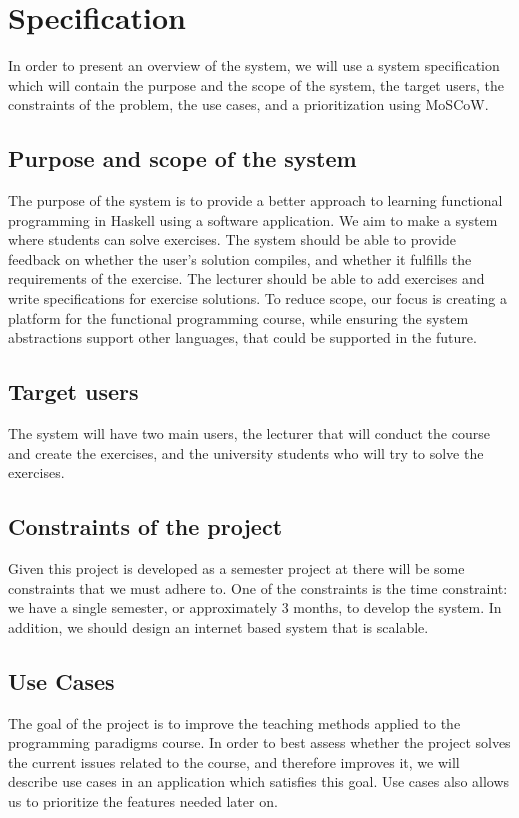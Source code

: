 \chapter{Specification}
In order to present an overview of the system, we will use a system specification which will contain the purpose and the scope of the system, the target users, the constraints of the problem, the use cases, and a prioritization using MoSCoW.

\section*{Purpose and scope of the system }
The purpose of the system is to provide a better approach to learning functional programming in Haskell using a software application.
We aim to make a system where students can solve exercises. The system should be able to provide feedback on whether the user's solution compiles, and whether it fulfills the requirements of the exercise. 
The lecturer should be able to add exercises and write specifications for exercise solutions.
To reduce scope, our focus is creating a platform for the functional programming course, while ensuring the system abstractions support other languages, that could be supported in the future.

\section*{Target users}
The system will have two main users, the lecturer that will conduct the course and create the exercises, and the university students who will try to solve the exercises.


\section*{Constraints of the project}
Given this project is developed as a semester project at \aau{} there will be some constraints that we must adhere to. 
One of the constraints is the time constraint: we have a single semester, or approximately 3 months, to develop the system. 
In addition, we should design an internet based system that is scalable. 
 
\section*{Use Cases}
The goal of the project is to improve the teaching methods applied to the programming paradigms course. 
In order to best assess whether the project solves the current issues related to the course, and therefore improves it, we will describe use cases in an application which satisfies this goal.
Use cases also allows us to prioritize the features needed later on.

